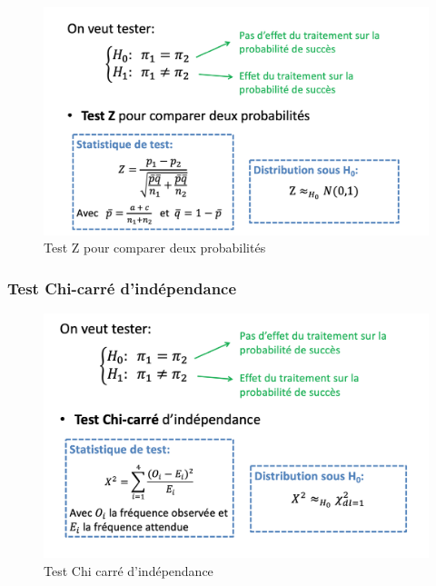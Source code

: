 \begin{figure}[H]
    \centering
    \includegraphics[scale=0.5]{images/testZ.png}
    \caption{Test Z pour comparer deux probabilités}
    \label{fig:my_label}
\end{figure}


\subsubsection{Test Chi-carré d’indépendance} 
\begin{figure}[H]
    \centering
    \includegraphics[scale =0.5]{images/testchisquare.png}
    \caption{Test Chi carré d'indépendance}
    \label{fig:my_label}
\end{figure}

